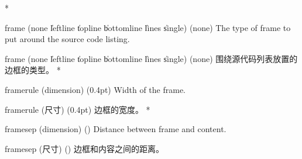 \begin{optionlist}
\begin{paracol}{2}
\switchcolumn[0]*%
\item[frame (none \| leftline \| topline \| bottomline \| lines \| single) (none)]
The type of frame to put around the source code listing.
\switchcolumn
\item[frame (none \| leftline \| topline \| bottomline \| lines \| single) (none)]
围绕源代码列表放置的边框的类型。
\switchcolumn[0]*%
\item[framerule (dimension) (0.4pt)]
Width of the frame.
\switchcolumn
\item[framerule (尺寸) (0.4pt)]
边框的宽度。
\switchcolumn[0]*%
  \item[framesep (dimension) (\cmd\fboxsep)]
    Distance between frame and content.
    \switchcolumn
    \item[framesep (尺寸) (\cmd\fboxsep)]
    边框和内容之间的距离。
\end{paracol}
\end{optionlist}

